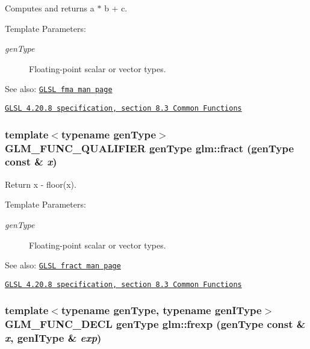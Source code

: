 Computes and returns a $\ast$ b + c.

\begin{Desc}
\item[Template Parameters:]
\begin{description}
\item[{\em genType}]Floating-point scalar or vector types.\end{description}
\end{Desc}
\begin{Desc}
\item[See also:]\href{http://www.opengl.org/sdk/docs/manglsl/xhtml/fma.xml}{\tt GLSL fma man page} 

\href{http://www.opengl.org/registry/doc/GLSLangSpec.4.20.8.pdf}{\tt GLSL 4.20.8 specification, section 8.3 Common Functions} \end{Desc}
\hypertarget{group__core__func__common_g7418318e0c1a82f21805628aabb0e24e}{
\subsubsection[fract]{\setlength{\rightskip}{0pt plus 5cm}template$<$typename genType$>$ GLM\_\-FUNC\_\-QUALIFIER genType glm::fract (genType const \& {\em x})}}
\label{group__core__func__common_g7418318e0c1a82f21805628aabb0e24e}


Return x - floor(x).

\begin{Desc}
\item[Template Parameters:]
\begin{description}
\item[{\em genType}]Floating-point scalar or vector types.\end{description}
\end{Desc}
\begin{Desc}
\item[See also:]\href{http://www.opengl.org/sdk/docs/manglsl/xhtml/fract.xml}{\tt GLSL fract man page} 

\href{http://www.opengl.org/registry/doc/GLSLangSpec.4.20.8.pdf}{\tt GLSL 4.20.8 specification, section 8.3 Common Functions} \end{Desc}
\hypertarget{group__core__func__common_g70c119cca554aacd36008191e2c4b2bb}{
\subsubsection[frexp]{\setlength{\rightskip}{0pt plus 5cm}template$<$typename genType, typename genIType$>$ GLM\_\-FUNC\_\-DECL genType glm::frexp (genType const \& {\em x}, \/  genIType \& {\em exp})}}
\label{group__core__func__common_g70c119cca554aacd36008191e2c4b2bb}


